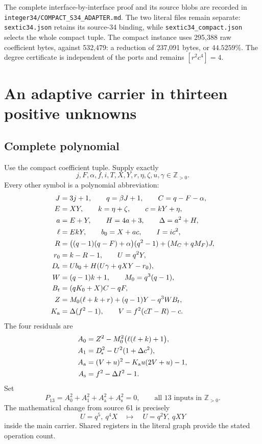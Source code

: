 \documentclass[11pt,a4paper]{article}
\theoremstyle{definition}
\newcommand{\Zp}{\mathbb Z_{>0}}
\newcommand{\MC}{M_C}
\newcommand{\MF}{M_F}
\newcommand{\Dstar}{D_{\!*}}
\newcommand{\Kaux}{K_{\mathrm a}}
\newcommand{\src}[1]{{\urlstyle{tt}\nolinkurl{#1}}}
\begin{document}
The complete interface-by-interface proof and its source blobs
are recorded in \src{integer34/COMPACT_S34_ADAPTER.md}.
The two literal files remain separate:
\src{sextic34.json} retains its source-34 binding, while
\src{sextic34_compact.json} selects the whole compact tuple.
The compact instance uses 295,388 raw coefficient bytes,
against 532,479: a reduction of 237,091 bytes, or \(44.5259\%\).
The degree certificate is independent of the ports and remains
\([r^2c^4]=4\).

\section{An adaptive carrier in thirteen positive unknowns}
\label{sec:p13}

\subsection{Complete polynomial}

Use the compact coefficient tuple. Supply exactly
\[
 j,F,\alpha,f,i,T,X,Y,r,\eta,\zeta,u,\gamma\in\Zp.
\]
Every other symbol is a polynomial abbreviation:
\begin{align}
 J&=3j+1,\qquad q=\beta J+1,\qquad C=q-F-\alpha, \notag\\
 E&=XY,\qquad k=\eta+\zeta,\qquad c=kY+\eta, \notag\\
 a&=E+Y,\qquad H=4a+3,\qquad\Delta=a^2+H, \notag\\
 \ell&=EkY,\qquad b_0=X+ac,\qquad I=ic^2, \notag\\
 R&=\bigl((q-1)(q-F)+\alpha\bigr)(q^2-1)
                    +(\MC+q\MF)J, \notag\\
 r_0&=k-R-1,\qquad U=q^2Y, \notag\\
 \Dstar&=U b_0+H(U\gamma+qXY-r_0), \notag\\
 W&=(q-1)k+1,\qquad M_0=q^3(q-1), \notag\\
 B_t&=(qK_0+X)C-qF, \notag\\
 Z&=M_0(\ell+k+r)+(q-1)Y-q^3WB_t, \notag\\
 \Kaux&=\Delta(f^2-1),\qquad
 V=f^2(cT-R)-c.                                \label{eq:p13registers}
\end{align}
The four residuals are
\begin{align}
 A_0&=Z^2-M_0^2\bigl(\ell(\ell+k)+1\bigr), \notag\\
 A_1&=\Dstar^2-U^2(1+\Delta c^2), \notag\\
 A_{\mathrm a}&=(V+u)^2-\Kaux u(2V+u)-1, \notag\\
 A_{\mathrm s}&=f^2-\Delta I^2-1.                \label{eq:p13residuals}
\end{align}
Set
\[
 \boxed{P_{13}=A_0^2+A_1^2+A_{\mathrm a}^2+A_{\mathrm s}^2=0,
           \qquad\text{all 13 inputs in }\Zp.}   \tag{P13}
\]
The mathematical change from source 61 is precisely
\[
 \boxed{U=q^5,\ q^4X
       \quad\longmapsto\quad U=q^2Y,\ qXY}
\]
inside the main carrier. Shared registers in the literal graph
provide the stated operation count.
\end{document}
